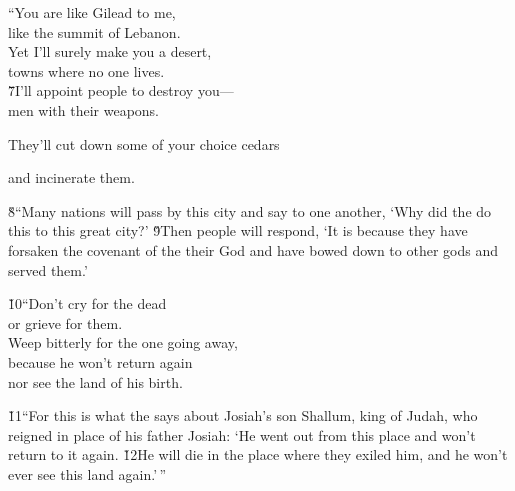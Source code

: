\begin{poetry}
\poeml ``You are like Gilead to me, \\
\poemll    like the summit of Lebanon. \\
\poeml Yet I'll surely make you a desert, \\
\poemll    towns where no one lives. \\
\poeml \v{7}I'll appoint people to destroy you--- \\
\poemll    men with their weapons.
\end{poetry}

They'll cut down some of your choice cedars

\begin{poetry}
\poemll    and incinerate them.
\end{poetry}

\v{8}``Many nations will pass by this city and say to one another, `Why did the  do this to this great city?' \v{9}Then people will respond, `It is because they have forsaken the covenant of the  their God and have bowed down to other gods and served them.'

\begin{poetry}
\poeml \v{10}``Don't cry for the dead \\
\poemll    or grieve for them. \\
\poeml Weep bitterly for the one going away, \\
\poemll    because he won't return again \\
\poemlll       nor see the land of his birth.
\end{poetry}

\v{11}``For this is what the  says about Josiah's son Shallum, king of Judah, who reigned in place of his father Josiah: `He went out from this place and won't return to it again. \v{12}He will die in the place where they exiled him, and he won't ever see this land again.'\,''


